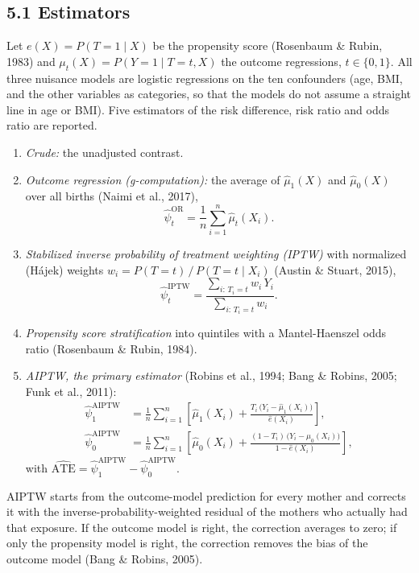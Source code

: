 \documentclass[11pt,letterpaper]{article}
\begin{document}
\subsection*{5.1 Estimators}

Let $e(X) = P(T = 1 \mid X)$ be the propensity score (Rosenbaum \& Rubin, 1983) and $\mu_t(X) = P(Y = 1 \mid T = t, X)$ the outcome regressions, $t \in \{0, 1\}$. All three nuisance models are logistic regressions on the ten confounders (age, BMI, and the other variables as categories, so that the models do not assume a straight line in age or BMI). Five estimators of the risk difference, risk ratio and odds ratio are reported.
\begin{enumerate}[leftmargin=2.2em,itemsep=2pt,topsep=3pt]
\item \emph{Crude:} the unadjusted contrast.
\item \emph{Outcome regression (g-computation):} the average of $\hat\mu_1(X)$ and $\hat\mu_0(X)$ over all births (Naimi et al., 2017),
\begin{equation}\hat\psi_t^{\mathrm{OR}} = \frac{1}{n}\sum_{i=1}^{n}\hat\mu_t(X_i).\end{equation}
\item \emph{Stabilized inverse probability of treatment weighting (IPTW)} with normalized (H\'ajek) weights $w_i = P(T = t)\,/\,P(T = t \mid X_i)$ (Austin \& Stuart, 2015),
\begin{equation}\hat\psi_t^{\mathrm{IPTW}} = \frac{\sum_{i:\,T_i = t} w_i\,Y_i}{\sum_{i:\,T_i = t} w_i}.\end{equation}
\item \emph{Propensity score stratification} into quintiles with a Mantel-Haenszel odds ratio (Rosenbaum \& Rubin, 1984).
\item \emph{AIPTW, the primary estimator} (Robins et al., 1994; Bang \& Robins, 2005; Funk et al., 2011):
\begin{align}
\hat\psi_1^{\mathrm{AIPTW}} &= \frac{1}{n}\sum_{i=1}^{n}\left[\hat\mu_1(X_i) + \frac{T_i\,\big(Y_i - \hat\mu_1(X_i)\big)}{\hat e(X_i)}\right],\\
\hat\psi_0^{\mathrm{AIPTW}} &= \frac{1}{n}\sum_{i=1}^{n}\left[\hat\mu_0(X_i) + \frac{(1 - T_i)\,\big(Y_i - \hat\mu_0(X_i)\big)}{1 - \hat e(X_i)}\right],
\end{align}
with $\widehat{\mathrm{ATE}} = \hat\psi_1^{\mathrm{AIPTW}} - \hat\psi_0^{\mathrm{AIPTW}}$.
\end{enumerate}
AIPTW starts from the outcome-model prediction for every mother and corrects it with the inverse-probability-weighted residual of the mothers who actually had that exposure. If the outcome model is right, the correction averages to zero; if only the propensity model is right, the correction removes the bias of the outcome model (Bang \& Robins, 2005).
\end{document}
